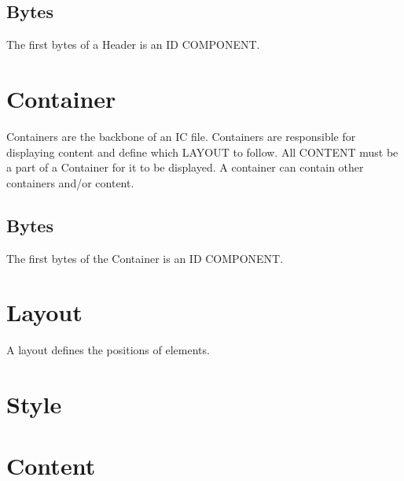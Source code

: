 \documentclass{report}
\begin{document}
\subsection{Bytes}
The first bytes of a Header is an ID COMPONENT. 

\section{Container}
Containers are the backbone of an IC file. Containers are responsible for displaying content and define which LAYOUT to follow. All CONTENT must be a part of a Container for it to be displayed. A container can contain other containers and/or content.\\

\subsection{Bytes}
The first bytes of the Container is an ID COMPONENT.

\section{Layout}
A layout defines the positions of elements. 
\section{Style}
\section{Content}
\end{document}

